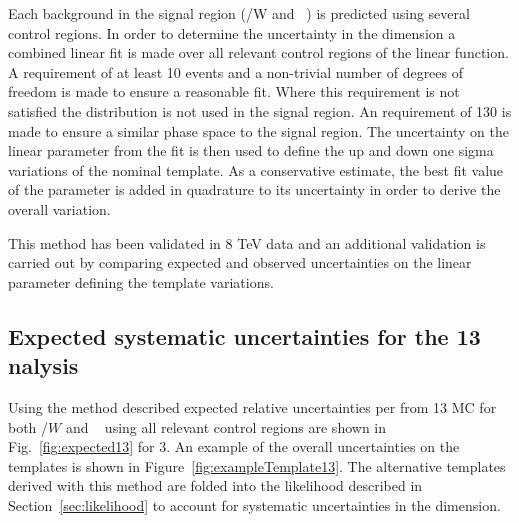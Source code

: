 Each background in the signal region (\ttbar/W  and \zInv~) is predicted  using several control regions. 
In order to determine the uncertainty in the \mht dimension a combined linear fit is made over all relevant control regions
of the linear function. A requirement of at least 10 events and a non-trivial number of degrees of freedom
 is made to ensure a reasonable fit. Where this requirement is not satisfied the \mht distribution is not used in the signal region.
An \mht requirement of 130 \GeV is made to ensure a similar phase space to the signal region.
The uncertainty on the linear parameter from the fit is then used to define the up and down one sigma variations of the nominal template.
As a conservative estimate, the best fit value of the parameter is added in quadrature to its uncertainty in order to derive the overall variation.

This method has been validated in 8 TeV data and an additional validation is carried out by comparing expected and observed uncertainties
on the linear parameter defining the template variations.



\subsection{Expected systematic uncertainties for the 13 \texorpdfstring{\TeV} analysis}
Using the method described expected relative uncertainties per \GeV from 13 \TeV MC for both \ttbar/$W$  and \zInv~ using all relevant control regions are
shown in Fig.~\ref{fig:expected13} for 3\ifb. An example of the overall uncertainties on the \mht templates is shown
in Figure~\ref{fig:exampleTemplate13}. The alternative templates derived with this method are folded into the 
likelihood described in Section~\ref{sec:likelihood} to account for systematic uncertainties in the \mht dimension.


